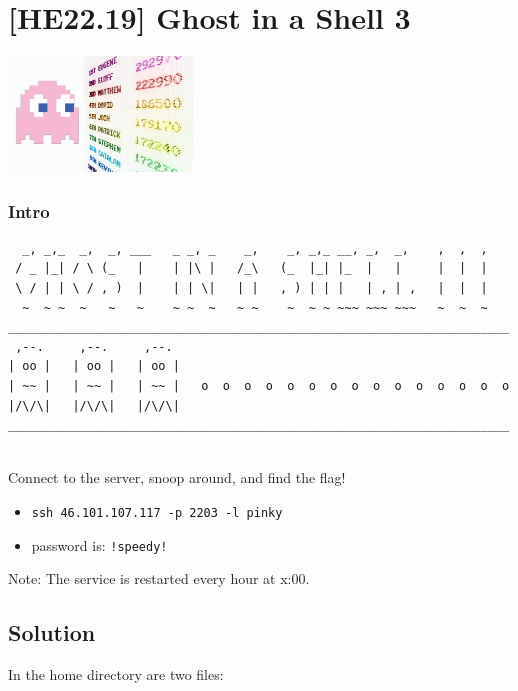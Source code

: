 
\hypertarget{he22.19}{%
\chapter{[HE22.19] Ghost in a Shell 3}\label{he22.19}}

\begin{marginfigure}
	\includegraphics[width=49mm]{level5/challenge19.jpg}
\end{marginfigure}
\subsection{Intro}
\begin{fullwidth}
	{\tiny
\begin{verbatim}
  _, _,_  _,  _, ___   _ _, _    _,    _, _,_ __, _,  _,    ,  ,  ,  
 / _ |_| / \ (_   |    | |\ |   /_\   (_  |_| |_  |   |     |  |  |  
 \ / | | \ / , )  |    | | \|   | |   , ) | | |   | , | ,   |  |  |  
  ~  ~ ~  ~   ~   ~    ~ ~  ~   ~ ~    ~  ~ ~ ~~~ ~~~ ~~~   ~  ~  ~  
______________________________________________________________________  
 ,--.     ,--.     ,--.  
| oo |   | oo |   | oo |   
| ~~ |   | ~~ |   | ~~ |   o  o  o  o  o  o  o  o  o  o  o  o  o  o  o  
|/\/\|   |/\/\|   |/\/\|     
______________________________________________________________________  
  
\end{verbatim}
}
\end{fullwidth}

\noindent Connect to the server, snoop around, and find the flag!
\begin{itemize}
\item \verb+ssh 46.101.107.117 -p 2203 -l pinky+
\item password is: \verb+!speedy!+
\end{itemize}

Note: The service is restarted every hour at x:00.

\section{Solution}\label{hv22.19solution}
In the home directory are two files:

